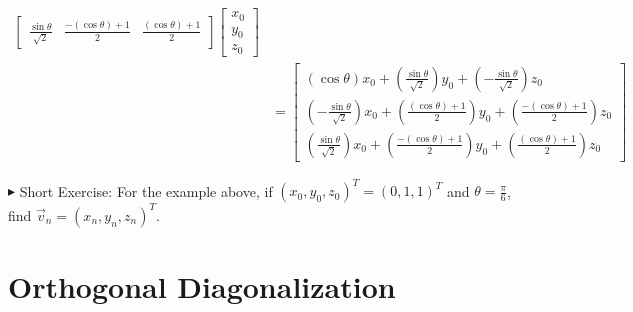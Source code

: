 \begin{solution}
\begin{align*}
\begin{bmatrix}
\frac{\sin{\theta}}{\sqrt{2}} & \frac{-(\cos{\theta}) + 1}{2} & \frac{(\cos{\theta}) + 1}{2}
\end{bmatrix}
\begin{bmatrix}
x_0 \\
y_0 \\
z_0
\end{bmatrix} \\
&=
\begin{bmatrix}
(\cos{\theta})x_0 + \left(\frac{\sin{\theta}}{\sqrt{2}}\right)y_0 + \left(-\frac{\sin{\theta}}{\sqrt{2}}\right)z_0 \\
\left(-\frac{\sin{\theta}}{\sqrt{2}}\right)x_0 + \left(\frac{(\cos{\theta}) + 1}{2}\right)y_0 + \left(\frac{-(\cos{\theta}) + 1}{2}\right)z_0 \\
\left(\frac{\sin{\theta}}{\sqrt{2}}\right)x_0 + \left(\frac{-(\cos{\theta}) + 1}{2}\right)y_0 + \left(\frac{(\cos{\theta}) + 1}{2}\right)z_0
\end{bmatrix}
\end{align*}
\end{solution}
$\blacktriangleright$ Short Exercise: For the example above, if $(x_0, y_0, z_0)^T = (0,1,1)^T$ and $\theta = \frac{\pi}{6}$, find $\vec{v}_n = (x_n, y_n, z_n)^T$.\footnotemark

\section{Orthogonal Diagonalization}
\label{section:orthogonaldiagreal}

